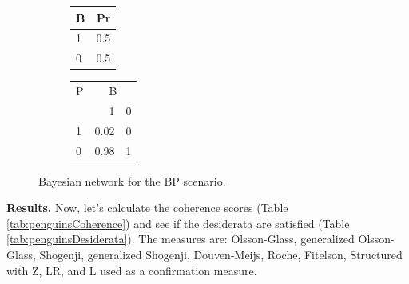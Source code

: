 \documentclass[
  10pt,
]{scrartcl}
\begin{document}
\begin{figure}[H]
 \hfill
\hspace{-3cm}\begin{subfigure}[!ht]{0.4\textwidth}

\begin{tabular}{lr}
\toprule
B & Pr\\
\midrule
1 & 0.5\\
0 & 0.5\\
\bottomrule
\end{tabular}


\begin{tabular}{lrr}
\toprule
\multicolumn{1}{c}{P} & \multicolumn{2}{c}{B} \\
  & 1 & 0\\
\midrule
1 & 0.02 & 0\\
0 & 0.98 & 1\\
\bottomrule
\end{tabular}
\end{subfigure}
\caption{Bayesian network for the \textsf{BP} scenario.}
\label{fig:BP}
\end{figure}

\noindent \textbf{Results.} Now, let's calculate the coherence scores (Table \ref{tab:penguinsCoherence}) and see if the desiderata are satisfied (Table \ref{tab:penguinsDesiderata}). The measures are: Olsson-Glass, generalized Olsson-Glass, Shogenji, generalized Shogenji, Douven-Meijs, Roche, Fitelson, Structured with Z, LR, and L used as a confirmation measure.
\end{document}

